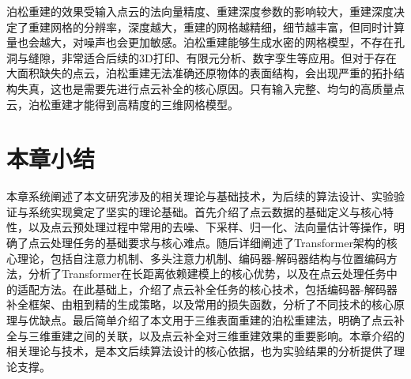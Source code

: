 泊松重建的效果受输入点云的法向量精度、重建深度参数的影响较大，重建深度决定了重建网格的分辨率，深度越大，重建的网格越精细，细节越丰富，但同时计算量也会越大，对噪声也会更加敏感。泊松重建能够生成水密的网格模型，不存在孔洞与缝隙，非常适合后续的3D打印、有限元分析、数字孪生等应用。但对于存在大面积缺失的点云，泊松重建无法准确还原物体的表面结构，会出现严重的拓扑结构失真，这也是需要先进行点云补全的核心原因。只有输入完整、均匀的高质量点云，泊松重建才能得到高精度的三维网格模型。



\section{本章小结}
本章系统阐述了本文研究涉及的相关理论与基础技术，为后续的算法设计、实验验证与系统实现奠定了坚实的理论基础。首先介绍了点云数据的基础定义与核心特性，以及点云预处理过程中常用的去噪、下采样、归一化、法向量估计等操作，明确了点云处理任务的基础要求与核心难点。随后详细阐述了Transformer架构的核心理论，包括自注意力机制、多头注意力机制、编码器-解码器结构与位置编码方法，分析了Transformer在长距离依赖建模上的核心优势，以及在点云处理任务中的适配方法。在此基础上，介绍了点云补全任务的核心技术，包括编码器-解码器补全框架、由粗到精的生成策略，以及常用的损失函数，分析了不同技术的核心原理与优缺点。最后简单介绍了本文用于三维表面重建的泊松重建法，明确了点云补全与三维重建之间的关联，以及点云补全对三维重建效果的重要影响。本章介绍的相关理论与技术，是本文后续算法设计的核心依据，也为实验结果的分析提供了理论支撑。
